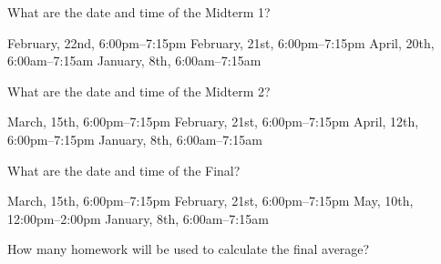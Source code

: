 \documentclass[addpoints, 12pt]{exam}%
\theoremstyle{definition}
\newcommand{\spc}{\vspace*{0.5cm}}
\begin{document}
\begin{questions}
\newpage

\question[1]
What are the date and time of the Midterm 1?

\begin{choices}
\CorrectChoice February, 22nd, 6:00pm--7:15pm
\choice February, 21st, 6:00pm--7:15pm
\choice April, 20th, 6:00am--7:15am
\choice January, 8th, 6:00am--7:15am
\end{choices}

\spc

\question[1]
What are the date and time of the Midterm 2?

\begin{choices}
\choice March, 15th, 6:00pm--7:15pm
\choice February, 21st, 6:00pm--7:15pm
\CorrectChoice April, 12th, 6:00pm--7:15pm
\choice January, 8th, 6:00am--7:15am
\end{choices}

\spc

\question[1]
What are the date and time of the Final?

\begin{choices}
\choice March, 15th, 6:00pm--7:15pm
\choice February, 21st, 6:00pm--7:15pm
\CorrectChoice May, 10th, 12:00pm--2:00pm
\choice January, 8th, 6:00am--7:15am
\end{choices}

\spc

\question[1]
How many homework will be used to calculate the final average?

\begin{oneparchoices}
\end{oneparchoices}
	
\end{questions}
\end{document}
